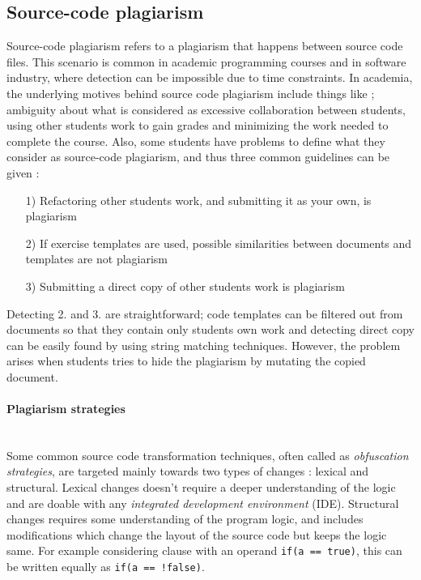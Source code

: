 \subsection{Source-code plagiarism}

Source-code plagiarism refers to a plagiarism that happens between source code files. This 
scenario is common in academic programming courses and in software industry, where detection can be impossible due to time constraints. In academia, the underlying motives behind source code plagiarism include things like \cite{DPPA2008}; ambiguity about what is considered as excessive collaboration between students, using other students work to gain grades and minimizing the work needed to complete the course. Also, some students have problems to define what they consider as source-code plagiarism, and thus three common guidelines can be given \cite{Pieterse2014DecodingCP}:

\begin{enumerate}
    \item[1)] Refactoring other students work, and submitting it as your own, is plagiarism
    \item[2)] If exercise templates are used, possible similarities between documents and templates are not plagiarism
    \item[3)] Submitting a direct copy of other students work is plagiarism
\end{enumerate}

\noindent
Detecting 2. and 3. are straightforward; code templates can be filtered out from documents so that they contain only students own work and detecting direct copy can be easily found by using string matching techniques. However, the problem arises when students tries to hide the plagiarism by mutating the copied document.

\paragraph{Plagiarism strategies}\mbox{}\\
Some common source code transformation techniques, often called as \emph{obfuscation strategies}, are targeted mainly towards two types of changes \cite{DPPA2008}: lexical and structural. Lexical changes doesn't require a deeper understanding of the logic and are doable with any \emph{integrated development environment} (IDE). Structural changes requires some understanding of the program logic, and includes modifications which change the layout of the source code but keeps the logic same. For example considering clause with an operand \texttt{if(a == true)}, this can be written equally as \texttt{if(a == !false)}.

